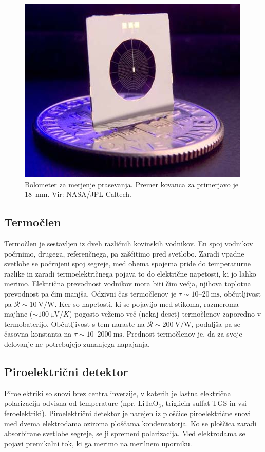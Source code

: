 \begin{figure}[h]
\centering
\includegraphics[width=75truemm]{slike/11_Bolometer.jpg}
\caption{Bolometer za merjenje prasevanja. Premer kovanca za primerjavo je 18~mm. 
Vir: NASA/JPL-Caltech.}
\label{fig:Bolometer}
\end{figure}

\subsection*{Termočlen}
Termočlen je sestavljen iz dveh različnih kovinskih vodnikov. 
En spoj vodnikov počrnimo, drugega, 
referenčnega, pa zaščitimo pred svetlobo. Zaradi vpadne svetlobe se počrnjeni spoj 
segreje, med obema spojema pride do temperaturne razlike in zaradi termoelektričnega 
pojava to do električne napetosti, ki jo lahko merimo. Električna prevodnost
vodnikov mora biti čim večja, njihova toplotna prevodnost pa čim manjša. Odzivni čas termočlenov je 
$\tau \sim 10$--$20~\si{\milli\second}$, občutljivost pa $\mathcal{R} \sim 10~\si{\volt/\watt}$.
Ker so napetosti, ki se pojavijo med stikoma, razmeroma majhne 
($\sim 100~\si{\micro\volt/K}$) pogosto vežemo več (nekaj deset) termočlenov zaporedno v
termobaterijo. Občutljivost s tem naraste na $\mathcal{R} \sim 200~\si{\volt/\watt}$, podaljša 
pa se časovna konstanta na $\tau \sim 10$--$2000~\si{\milli\second}$. Prednost termočlenov je,
da za svoje delovanje ne potrebujejo zunanjega napajanja. 

\subsection*{Piroelektrični detektor}
Piroelektriki so snovi brez centra inverzije, 
v katerih je lastna električna 
polarizacija odvisna od temperature (npr. LiTaO$_3$, 
triglicin sulfat TGS in vsi feroelektriki). Piroelektrični detektor je narejen iz 
ploščice piroelektrične snovi med dvema elektrodama oziroma ploščama kondenzatorja.
Ko se ploščica zaradi absorbirane svetlobe segreje, se ji spremeni polarizacija. Med 
elektrodama se pojavi premikalni tok, ki ga merimo na merilnem uporniku.

